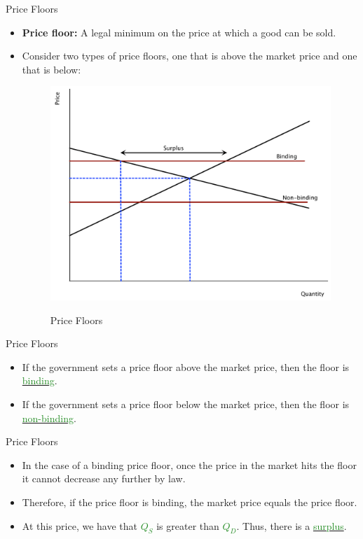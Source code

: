 \documentclass[xcolor={dvipsnames},pdf, hyperref={colorlinks=true, citecolor=ForestGreen, linkcolor=BlueViolet, urlcolor=Magenta}]{beamer}
\newcommand{\defn}[1]{\textbf{#1}}
\newcommand{\blank}[0]{}
\newcommand{\ddp}[1]{{\textcolor{ForestGreen}{#1}}}
\newcommand{\dd}[1]{{\underline{\textcolor{ForestGreen}{#1}}}}
\begin{document}
\begin{frame}{Price Floors}
	\begin{itemize}
		\item \defn{Price floor:} A legal minimum on the price at which a good can be sold.
		
		\item Consider two types of price floors, one that is above the market price and one that is below:
			\blank\blank\blank\blank	
		\begin{figure}[H]
			\centering
			\ddp{\includegraphics[scale=.30]{plot35.pdf}}
			\caption{Price Floors}
		\end{figure}
	\end{itemize}
\end{frame}

\begin{frame}{Price Floors}
	\begin{itemize}
		\item 	If the government sets a price floor above the market price, then the floor is \dd{binding}.
		\item If the government sets a price floor below the market price, then the floor is \dd{non-binding}.
	\end{itemize}
\end{frame}

\begin{frame}{Price Floors}
	\begin{itemize}
		\item In the case of a binding price floor, once the price in the market hits the floor it cannot decrease any further by law.
		\item  Therefore, if the price floor is binding, the market price equals the price floor.
		\item At this price, we have that \dd{$Q_S$} is greater than \dd{$Q_D$}. Thus, there is a \dd{surplus}.
	\end{itemize}
\end{frame}
\end{document}
